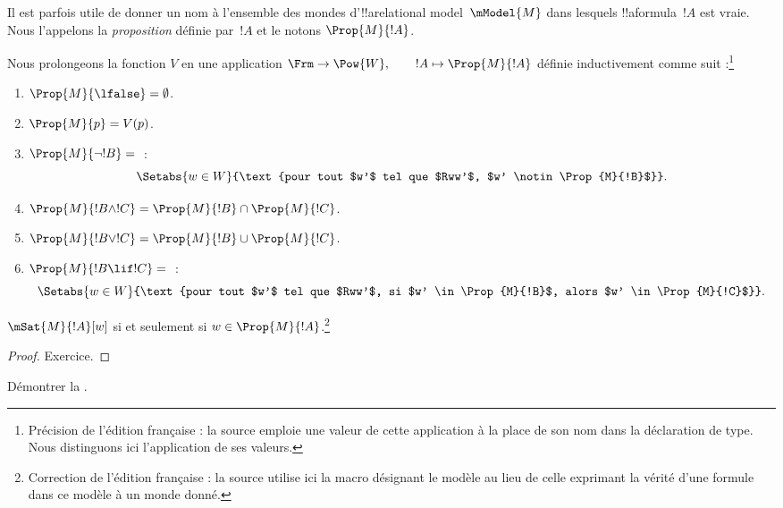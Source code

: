 \documentclass[../../../include/open-logic-section]{subfiles}
\begin{document}


Il est parfois utile de donner un nom à l'ensemble des mondes
d'!!a{relational model}~$\mModel{M}$ dans lesquels
!!a{formula}~$!A$ est vraie. Nous l'appelons la
\emph{proposition} définie par~$!A$ et le notons
$\Prop{M}{!A}$.

\begin{defn}
Nous prolongeons la fonction $V$ en une application
$\Frm\to\Pow{W},\qquad !A\mapsto\Prop{M}{!A}$
définie inductivement comme suit :\footnote{Précision de
l'édition française : la source emploie une valeur de cette
application à la place de son nom dans la déclaration
de type. Nous distinguons ici l'application de ses valeurs.}
\begin{enumerate}
\item $\Prop{M}{\lfalse}=\emptyset$.
\item $\Prop{M}{p}=V(p)$.
\item $\Prop{M}{\lnot !B}={}$ :
\[
\Setabs{w \in W}{\text{pour tout $w'$ tel que $Rww'$, $w'
    \notin \Prop{M}{!B}$}}.
\]
\item $\Prop{M}{!B\land !C}=\Prop{M}{!B}\cap\Prop{M}{!C}$.
\item $\Prop{M}{!B\lor !C}=\Prop{M}{!B}\cup\Prop{M}{!C}$.
\item $\Prop{M}{!B\lif !C}={}$ :
\[
\Setabs{w \in W}{\text{pour tout $w'$ tel que $Rww'$, si $w'
    \in \Prop{M}{!B}$, alors $w' \in \Prop{M}{!C}$}}.
\]
\end{enumerate}
\end{defn}

\begin{prop}
$\mSat{M}{!A}[w]$ si et seulement si
$w\in\Prop{M}{!A}$.\footnote{Correction de l'édition
française : la source utilise ici la macro désignant le
modèle au lieu de celle exprimant la vérité d'une formule
dans ce modèle à un monde donné.}
\end{prop}

\begin{proof}
Exercice.
\end{proof}

\begin{prob}
Démontrer la .
\end{prob}
\end{document}
